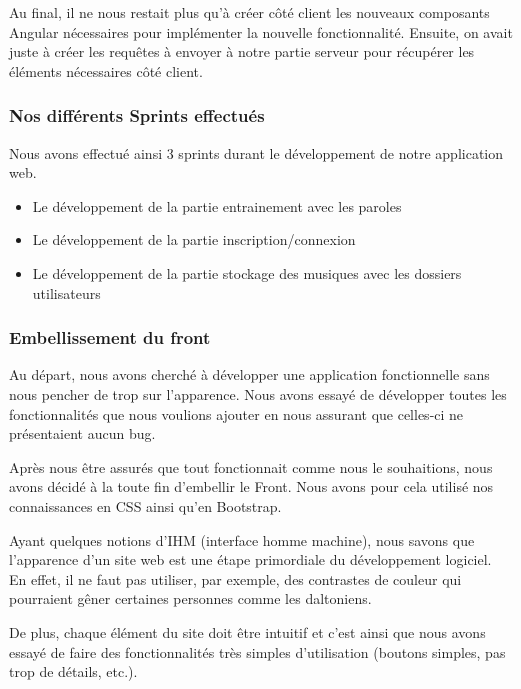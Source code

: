 \documentclass[12pt,french]{article}
\begin{document}
Au final, il ne nous restait plus qu'à créer côté client les nouveaux composants Angular nécessaires pour implémenter la nouvelle fonctionnalité. Ensuite, on avait juste à créer les requêtes à envoyer à notre partie serveur pour récupérer les éléments nécessaires côté client.

\subsubsection{Nos différents Sprints effectués}

Nous avons effectué ainsi 3 \gls{sprint}s durant le développement de notre application web.

\begin{itemize}
	\item Le développement de la partie entrainement avec les paroles
	\item Le développement de la partie inscription/connexion
	\item Le développement de la partie stockage des musiques avec les dossiers utilisateurs
\end{itemize}


\subsubsection{Embellissement du front}

Au départ, nous avons cherché à développer une application fonctionnelle sans nous pencher de trop sur l'apparence. Nous avons essayé de développer toutes les fonctionnalités que nous voulions ajouter en nous assurant que celles-ci ne présentaient aucun bug.

\medskip

Après nous être assurés que tout fonctionnait comme nous le souhaitions, nous avons décidé à la toute fin d'embellir le \gls{Front}. Nous avons pour cela utilisé nos connaissances en \gls{CSS} ainsi qu'en Bootstrap.

\medskip

Ayant quelques notions d'IHM (interface homme machine), nous savons que l'apparence d'un site web est une étape primordiale du développement logiciel. En effet, il ne faut pas utiliser, par exemple, des contrastes de couleur qui pourraient gêner certaines personnes comme les daltoniens.

De plus, chaque élément du site doit être intuitif et c'est ainsi que nous avons essayé de faire des fonctionnalités très simples d'utilisation (boutons simples, pas trop de détails, etc.).
\end{document}
